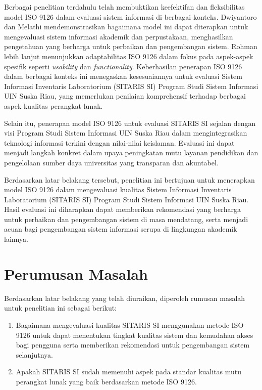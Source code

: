 Berbagai penelitian terdahulu telah membuktikan keefektifan dan fleksibilitas model ISO 9126 dalam evaluasi sistem informasi di berbagai konteks. Dwiyantoro \citeyear{dwiyantoro2020evaluasi} dan Melathi \citeyear{melathi2017penerapan} mendemonstrasikan bagaimana model ini dapat diterapkan untuk mengevaluasi sistem informasi akademik dan perpustakaan, menghasilkan pengetahuan yang berharga untuk perbaikan dan pengembangan sistem. Rohman \citeyear{rohman2022evaluasi} lebih lanjut menunjukkan adaptabilitas ISO 9126 dalam fokus pada aspek-aspek spesifik seperti \textit{usability} dan \textit{functionality}. Keberhasilan penerapan ISO 9126 dalam berbagai konteks ini menegaskan kesesuaiannya untuk evaluasi Sistem Informasi Inventaris Laboratorium (SITARIS SI) Program Studi Sistem Informasi UIN Suska Riau, yang memerlukan penilaian komprehensif terhadap berbagai aspek kualitas perangkat lunak.

Selain itu, penerapan model ISO 9126 untuk evaluasi SITARIS SI sejalan dengan visi Program Studi Sistem Informasi UIN Suska Riau dalam mengintegrasikan teknologi informasi terkini dengan nilai-nilai keislaman. Evaluasi ini dapat menjadi langkah konkret dalam upaya peningkatan mutu layanan pendidikan dan pengelolaan sumber daya universitas yang transparan dan akuntabel.

Berdasarkan latar belakang tersebut, penelitian ini bertujuan untuk menerapkan model ISO 9126 dalam mengevaluasi kualitas Sistem Informasi Inventaris Laboratorium (SITARIS SI) Program Studi Sistem Informasi UIN Suska Riau. Hasil evaluasi ini diharapkan dapat memberikan rekomendasi yang berharga untuk perbaikan dan pengembangan sistem di masa mendatang, serta menjadi acuan bagi pengembangan sistem informasi serupa di lingkungan akademik lainnya.

\section{Perumusan Masalah}
Berdasarkan latar belakang yang telah diuraikan, diperoleh rumusan masalah untuk penelitian ini sebagai berikut:
\begin{enumerate}
	\item Bagaimana mengevaluasi kualitas SITARIS SI menggunakan metode ISO 9126 untuk dapat menentukan tingkat kualitas sistem dan kemudahan akses bagi pengguna serta memberikan rekomendasi untuk pengembangan sistem selanjutnya.
	\item Apakah SITARIS SI sudah memenuhi aspek pada standar kualitas mutu perangkat lunak yang baik berdasarkan metode ISO 9126.
\end{enumerate}

